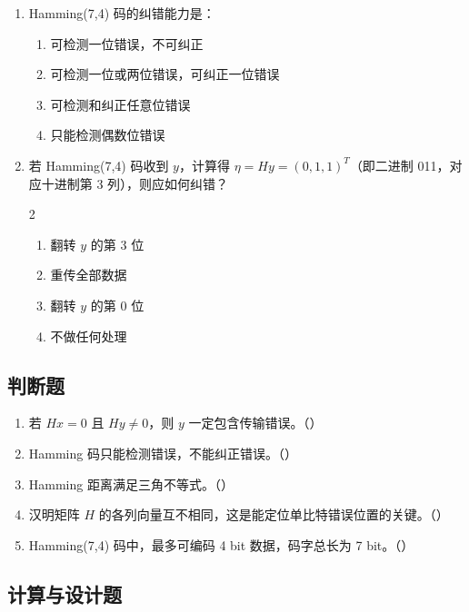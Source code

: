 \documentclass[12pt,a4paper]{ctexart}
\begin{document}
\begin{enumerate}[label=\arabic*., leftmargin=*]
\item Hamming(7,4) 码的纠错能力是：
\begin{enumerate}[label=(\Alph*)]
  \item 可检测一位错误，不可纠正
  \item 可检测一位或两位错误，可纠正一位错误
  \item 可检测和纠正任意位错误
  \item 只能检测偶数位错误
\end{enumerate}

\item 若 Hamming(7,4) 码收到 $y$，计算得 $\eta = Hy = (0,1,1)^T$（即二进制 011，对应十进制第 3 列），则应如何纠错？
\begin{multicols}{2}
\begin{enumerate}[label=(\Alph*)]
  \item 翻转 $y$ 的第 3 位
  \item 重传全部数据
  \item 翻转 $y$ 的第 0 位
  \item 不做任何处理
\end{enumerate}
\end{multicols}

\end{enumerate}

\subsection*{判断题}

\begin{enumerate}[label=\arabic*., leftmargin=*]
\item 若 $Hx=0$ 且 $Hy \neq 0$，则 $y$ 一定包含传输错误。（\quad）
\item Hamming 码只能检测错误，不能纠正错误。（\quad）
\item Hamming 距离满足三角不等式。（\quad）
\item 汉明矩阵 $H$ 的各列向量互不相同，这是能定位单比特错误位置的关键。（\quad）
\item Hamming(7,4) 码中，最多可编码 4 bit 数据，码字总长为 7 bit。（\quad）
\end{enumerate}

\subsection*{计算与设计题}
\end{document}
